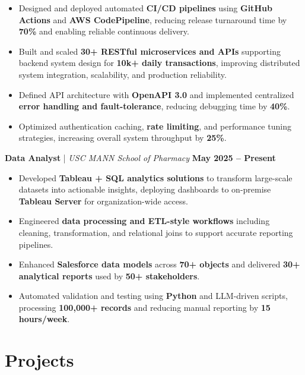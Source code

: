 \documentclass[letterpaper,11pt]{article}
\begin{document}
\begin{itemize}[noitemsep]
    \item Designed and deployed automated \textbf{CI/CD pipelines} using \textbf{GitHub Actions} and \textbf{AWS CodePipeline}, reducing release turnaround time by \textbf{70\%} and enabling reliable continuous delivery.
    \item 
    Built and scaled \textbf{30+ RESTful microservices and APIs} supporting backend system design for \textbf{10k+ daily transactions}, improving distributed system integration, scalability, and production reliability.
    \item Defined API architecture with \textbf{OpenAPI 3.0} and implemented centralized \textbf{error handling and fault-tolerance}, reducing debugging time by \textbf{40\%}.
    \item Optimized authentication caching, \textbf{rate limiting}, and performance tuning strategies, increasing overall system throughput by \textbf{25\%}.
\end{itemize}

\textbf{Data Analyst} \;|\; \textit{USC MANN School of Pharmacy} \hfill \textbf{May 2025 -- Present} \\

\begin{itemize}[noitemsep]
    \item Developed \textbf{Tableau + SQL analytics solutions} to transform large-scale datasets into actionable insights, deploying dashboards to on-premise \textbf{Tableau Server} for organization-wide access.
    \item Engineered \textbf{data processing and ETL-style workflows} including cleaning, transformation, and relational joins to support accurate reporting pipelines.
    \item Enhanced \textbf{Salesforce data models} across \textbf{70+ objects} and delivered \textbf{30+ analytical reports} used by \textbf{50+ stakeholders}.
    \item Automated validation and testing using \textbf{Python} and LLM-driven scripts, processing \textbf{100,000+ records} and reducing manual reporting by \textbf{15 hours/week}.
\end{itemize}



\section*{Projects}
\end{document}
